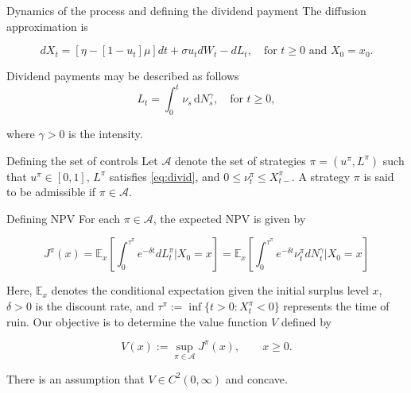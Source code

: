 \documentclass{beamer}
\theoremstyle{definition}
\newcommand{\E}{\mathbb{E}}
\begin{document}
\begin{frame}{Dynamics of the process and defining the dividend payment}
The diffusion approximation is

\begin{equation}
    dX_t = [\eta - [1 - u_t]\mu] dt + \sigma u_t dW_t - dL_t, \quad \text{for } t \ge 0 \text{ and } X_0 = x_0.
    \label{eq:diff_approx}
\end{equation}

Dividend payments may be described as follows
    \begin{equation}
    L_t = \int_0^t \nu_s \, \mathrm{d}N_s^\gamma, \quad \text{for } t \ge 0,
    \label{eq:divid}
    \end{equation}

where \(\gamma > 0\) is the intensity.

\end{frame}

\begin{frame}{Defining the set of controls}
Let $\mathcal{A}$ denote the set of strategies $\pi = (u^{\pi}, L^{\pi})$ such that $u^{\pi} \in [0,1]$, $L^{\pi}$ satisfies \eqref{eq:divid}, and $0 \le \nu_t^{\pi} \le X_{t-}^{\pi}$. 
A strategy $\pi$ is said to be admissible if $\pi \in \mathcal{A}$.

\end{frame}

\begin{frame}{Defining NPV}
For each \(\pi \in \mathcal{A}\), the expected NPV is given by

\begin{equation}
    J^\pi(x) = \E_x\left[\int_0^{\tau^\pi} e^{-\delta t} dL^\pi_t \bigg| X_0 = x \right] = \E_x\left[\int_0^{\tau^\pi} e^{-\delta t} \nu_t^\pi dN^\gamma_t\bigg| X_0 = x\right]
    \label{eq:npv}
\end{equation}

Here, $\E_x$ denotes the conditional expectation given the initial surplus level $x$, 
$\delta > 0$ is the discount rate, and 
$\tau^{\pi} := \inf\{ t > 0 : X_t^{\pi} < 0 \}$ represents the time of ruin. 
Our objective is to determine the value function $V$ defined by

\begin{equation}
V(x) := \sup_{\pi \in \mathcal{A}} J^{\pi}(x), \qquad x \ge 0.
\label{eq:NPV_max}
\end{equation}

There is an assumption that \(V \in C^2(0, \infty)\) and concave.

\end{frame}
\end{document}

